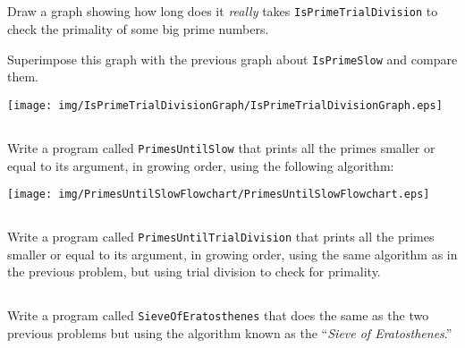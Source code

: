 \documentclass[a4paper, 12pt]{article}
\begin{document}
\subsection{}

Draw a graph showing how long does it \emph{really} takes
\texttt{IsPrimeTrialDivision} to check the primality of some big prime numbers.

Superimpose this graph with the previous graph about \texttt{IsPrimeSlow} and
compare them.

\begin{solution}
  \centering
  \texttt{[image: img/IsPrimeTrialDivisionGraph/IsPrimeTrialDivisionGraph.eps]}
\end{solution}

\subsection{}

Write a program called \texttt{PrimesUntilSlow} that prints all the primes
smaller or equal to its argument, in growing order, using the following
algorithm:

\begin{center}
  \texttt{[image: img/PrimesUntilSlowFlowchart/PrimesUntilSlowFlowchart.eps]}
\end{center}
\vspace{1cm}



\subsection{}

Write a program called \texttt{PrimesUntilTrialDivision} that prints all the
primes smaller or equal to its argument, in growing order, using the same
algorithm as in the previous problem, but using trial division to check for
primality.


\subsection{}

Write a program called \texttt{SieveOfEratosthenes} that does the same as the
two previous problems but using the algorithm known as the ``\emph{Sieve of
Eratosthenes}.''
\end{document}
